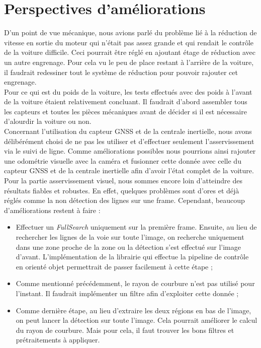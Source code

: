\documentclass[12pt, openany]{report}
\begin{document}
\section{Perspectives d'améliorations}
D'un point de vue mécanique, nous avions parlé du problème lié à la réduction de vitesse en sortie du moteur qui n'était pas assez grande et qui rendait le contrôle de la voiture difficile. Ceci pourrait être réglé en ajoutant étage de réduction avec un autre engrenage. Pour cela vu le peu de place restant à l'arrière de la voiture, il faudrait redessiner tout le système de réduction pour pouvoir rajouter cet engrenage.\\

Pour ce qui est du poids de la voiture, les tests effectués avec des poids à l'avant de la voiture étaient relativement concluant. Il faudrait d'abord assembler tous les capteurs et toutes les pièces mécaniques avant de décider si il est nécessaire d'alourdir la voiture ou non.\\

Concernant l'utilisation du capteur GNSS et de la centrale inertielle, nous avons délibérément choisi de ne pas les utiliser et d'effectuer seulement l'asservissement via le suivi de ligne. Comme améliorations possibles nous pourrions ainsi rajouter une odométrie visuelle avec la caméra et fusionner cette donnée avec celle du capteur GNSS et de la centrale inertielle afin d'avoir l'état complet de la voiture.\\ 

Pour la partie asservissement visuel, nous sommes encore loin d'atteindre des résultats fiables et robustes. En effet, quelques problèmes sont d'ores et déjà réglés comme la non détection des lignes sur une frame. Cependant, beaucoup d'améliorations restent à faire :
\begin{itemize}[label=\textbullet, font=\small]
    \item Effectuer un \textit{FullSearch} uniquement sur la première frame. Ensuite, au lieu de rechercher les lignes de la voie sur toute l'image, on recherche uniquement dans une zone proche de la zone ou la détection s'est effectué sur l'image d'avant. L'implémentation de la librairie qui effectue la pipeline de contrôle en orienté objet permettrait de passer facilement à cette étape ;
    \item Comme mentionné précédemment, le rayon de courbure n'est pas utilisé pour l'instant. Il faudrait implémenter un filtre afin d'exploiter cette donnée ;
    \item Comme dernière étape, au lieu d'extraire les deux régions en bas de l'image, on peut lancer la détection sur toute l'image. Cela pourrait améliorer le calcul du rayon de courbure. Mais pour cela, il faut trouver les bons filtres et prétraitements à appliquer.\\ 
\end{itemize}
\end{document}
